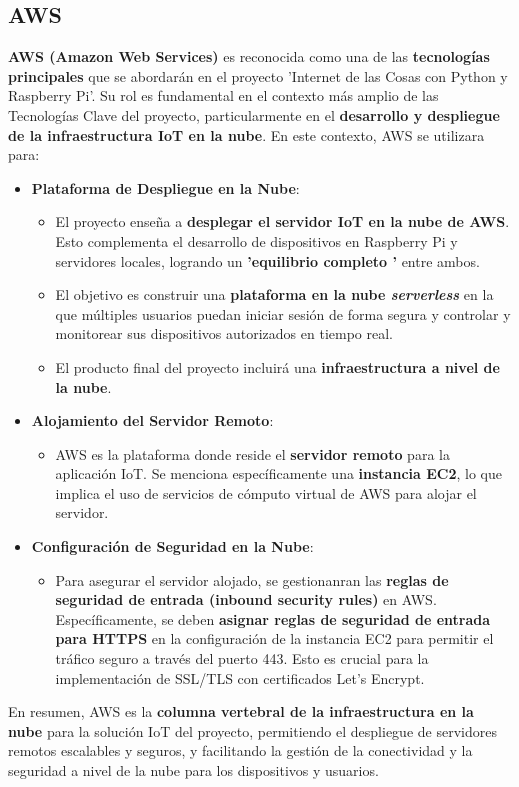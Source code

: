 \documentclass{report}
\begin{document}
\subsection{AWS}
\textbf{AWS (Amazon Web Services)} \cite{AWS} es reconocida como una de las \textbf{tecnologías principales} que se abordarán en el 
proyecto 'Internet de las Cosas con Python y Raspberry Pi'. Su rol es fundamental en el contexto más amplio de las Tecnologías Clave 
del proyecto, particularmente en el \textbf{desarrollo y despliegue de la infraestructura IoT en la nube}. En este contexto, AWS 
se utilizara para:
\begin{itemize}
    \item \textbf{Plataforma de Despliegue en la Nube}:
    \begin{itemize}
        \item El proyecto enseña a \textbf{desplegar el servidor IoT en la nube de AWS}. Esto complementa el 
        desarrollo de dispositivos en Raspberry Pi y servidores locales, logrando un \textbf{ 'equilibrio completo '} entre ambos.
        \item El objetivo es construir una \textbf{plataforma en la nube \textit{serverless}} en la que múltiples usuarios 
        puedan iniciar sesión de forma segura y controlar y monitorear sus dispositivos autorizados en tiempo real.
        \item El producto final del proyecto incluirá una \textbf{infraestructura a nivel de la nube}.
    \end{itemize}

    \item \textbf{Alojamiento del Servidor Remoto}:
    \begin{itemize}
        \item AWS es la plataforma donde reside el \textbf{servidor remoto} para la aplicación IoT. Se menciona específicamente 
        una \textbf{instancia EC2}, lo que implica el uso de servicios de cómputo virtual de AWS para alojar el servidor.
    \end{itemize}

    \item \textbf{Configuración de Seguridad en la Nube}:
    \begin{itemize}
        \item Para asegurar el servidor alojado, se gestionanran las \textbf{reglas de seguridad de entrada (inbound security rules)} 
        en AWS. Específicamente, se deben \textbf{asignar reglas de seguridad de entrada para HTTPS} en la configuración de la instancia 
        EC2 para permitir el tráfico seguro a través del puerto 443. Esto es crucial para la implementación de SSL/TLS con certificados 
        Let's Encrypt.
    \end{itemize}
\end{itemize}
En resumen, AWS es la \textbf{columna vertebral de la infraestructura en la nube} para la solución IoT del proyecto, permitiendo el 
despliegue de servidores remotos escalables y seguros, y facilitando la gestión de la conectividad y la seguridad a nivel de la nube 
para los dispositivos y usuarios.
\end{document}
